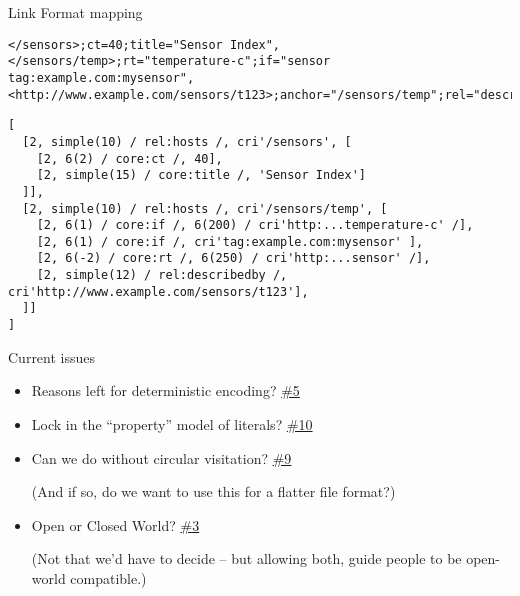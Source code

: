 \documentclass[aspectratio=169]{beamer}
\begin{document}
\begin{frame}[fragile]{Link Format mapping}\small
  \begin{verbatim}
</sensors>;ct=40;title="Sensor Index",
</sensors/temp>;rt="temperature-c";if="sensor tag:example.com:mysensor",
<http://www.example.com/sensors/t123>;anchor="/sensors/temp";rel="describedby"
  \end{verbatim}

  \begin{verbatim}
[
  [2, simple(10) / rel:hosts /, cri'/sensors', [
    [2, 6(2) / core:ct /, 40],
    [2, simple(15) / core:title /, 'Sensor Index']
  ]],
  [2, simple(10) / rel:hosts /, cri'/sensors/temp', [
    [2, 6(1) / core:if /, 6(200) / cri'http:...temperature-c' /],
    [2, 6(1) / core:if /, cri'tag:example.com:mysensor' ],
    [2, 6(-2) / core:rt /, 6(250) / cri'http:...sensor' /],
    [2, simple(12) / rel:describedby /, cri'http://www.example.com/sensors/t123'],
  ]]
]
  \end{verbatim}
\end{frame}

\begin{frame}{Current issues}\Large
  \begin{itemize}
    \item Reasons left for deterministic encoding? \href{https://github.com/core-wg/coral/issues/5}{\#5}
    \item Lock in the ``property'' model of literals? \href{https://github.com/core-wg/coral/issues/10}{\#10}
    \item Can we do without circular visitation? \href{https://github.com/core-wg/coral/issues/9}{\#9}

      (And if so, do we want to use this for a flatter file format?)
    \item Open or Closed World? \href{https://github.com/core-wg/coral/issues/3}{\#3}

      (Not that we'd have to decide -- but allowing both, guide people to be open-world compatible.)
  \end{itemize}
\end{frame}
\end{document}
